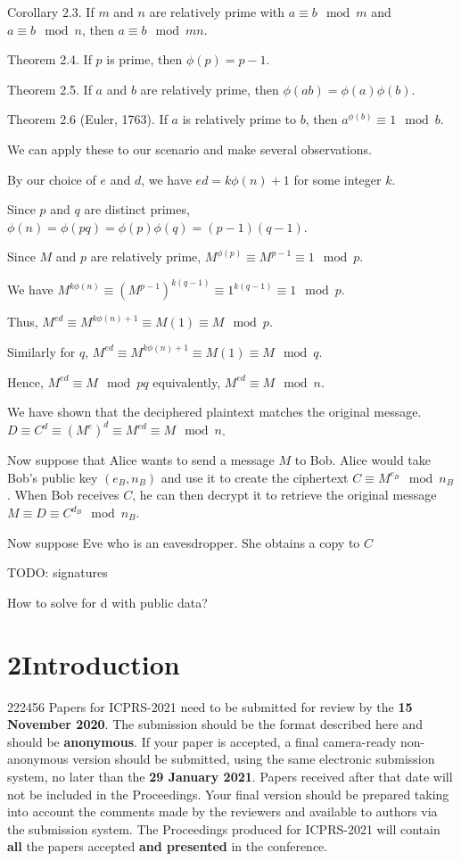 \documentclass[10pt]{article}
\begin{document}
Corollary 2.3. If $m$ and $n$ are relatively prime with $a \equiv b \mod m$ and $a \equiv b \mod n$, then $a \equiv b \mod m n$.

Theorem 2.4. If $p$ is prime, then $\phi(p) = p -1$.

Theorem 2.5. If $a$ and $b$ are relatively prime, then $\phi(a b) = \phi(a) \phi(b)$.

Theorem 2.6 (Euler, 1763). If $a$ is relatively prime to $b$, then $a^{\phi(b)} \equiv 1 \mod b$.

We can apply these to our scenario and make several observations.


By our choice of $e$ and $d$, we have $e d = k \phi(n) + 1$ for some integer $k$.

Since $p$ and $q$ are distinct primes,
$\phi(n) = \phi(p q) = \phi(p) \phi(q) = (p - 1) (q - 1)$.

Since $M$ and $p$ are relatively prime, $M^{\phi(p)} \equiv M^{p - 1} \equiv 1 \mod p$.

We have $M^{k \phi(n)} \equiv (M^{p - 1})^{k (q - 1)} \equiv 1^{k (q - 1)} \equiv 1 \mod p$.

Thus, $M^{e d} \equiv M^{k \phi(n) + 1} \equiv M (1) \equiv M \mod p$.

Similarly for $q$, $M^{e d} \equiv M^{k \phi(n) + 1} \equiv M (1) \equiv M \mod q$.

Hence, $M^{e d} \equiv M \mod p q$ equivalently, $M^{e d} \equiv M \mod n$.

We have shown that the deciphered plaintext matches the original message. $D \equiv C^d \equiv (M^e)^d \equiv M^{e d} \equiv M \mod n$.


Now suppose that Alice wants to send a message $M$ to Bob. Alice would take Bob’s public key $(e_B, n_B)$ and use it to create the ciphertext $C \equiv M^{e_B} \mod n_B$. When Bob receives $C$, he can then decrypt it to retrieve the original message $M \equiv D \equiv C^{d_B} \mod n_B$.

Now suppose Eve who is an eavesdropper. She obtains a copy to $C$


TODO: signatures

How to solve for d with public data?


\section{2Introduction}
222456 Papers for ICPRS-2021 need to be submitted for review by the \textbf{15 November 2020}. The submission should be the format described here and should be \textbf{anonymous}. If your paper is accepted, a final camera-ready non-anonymous version should be submitted, using the same electronic submission system, no later than the \textbf{29 January 2021}. Papers received after that date will not be included in the Proceedings. Your final version should be prepared taking into account the comments made by the reviewers and available to authors via the submission system. The Proceedings produced for ICPRS-2021 will contain \textbf{all} the papers accepted \textbf{and presented} in the conference.  
\end{document}
